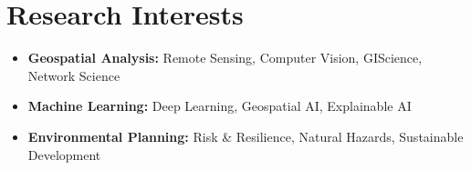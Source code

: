 \section*{Research Interests}
\begin{cvcontent}
\vspace{-8mm}
    \begin{itemize}[itemsep=-1mm]
        \item {\small \textbf{Geospatial Analysis:} Remote Sensing, Computer Vision, GIScience, Network Science}
        \item {\small \textbf{Machine Learning:} Deep Learning, Geospatial AI, Explainable AI}
        \item {\small \textbf{Environmental Planning:} Risk \& Resilience, Natural Hazards, Sustainable Development}
    \end{itemize}
\end{cvcontent}